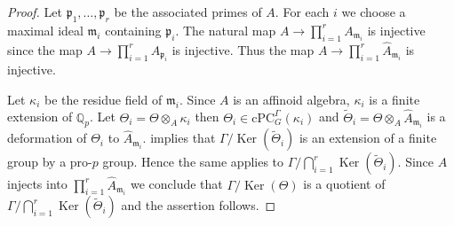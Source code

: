 \documentclass[10pt,a4paper]{amsart}
\DeclareMathOperator{\Ker}{Ker}
\newcommand{\Qp}{\mathbb {Q}_p}
\newcommand{\cPC}{\mathrm{cPC}}
\newcommand{\mm}{\mathfrak m}
\newcommand{\pp}{\mathfrak p}
\newcommand{\wTheta}{\widetilde{\Theta}}
\begin{document}
\begin{proof} Let $\pp_1, \ldots, \pp_r$ be the associated primes of $A$. For 
each $i$ 
we choose a maximal ideal $\mm_i$ containing $\pp_i$. The natural map 
$A\rightarrow \prod_{i=1}^r A_{\mm_i}$ is injective since the map 
$A\rightarrow \prod_{i=1}^r A_{\pp_i}$ is injective. Thus 
the map $A\rightarrow \prod_{i=1}^r \hat{A}_{\mm_i}$ is injective.

Let $\kappa_i$ be the residue field of $\mm_i$. Since $A$ is an affinoid algebra, 
$\kappa_i$ is a finite extension of $\Qp$. Let $\Theta_i=\Theta\otimes_A \kappa_i$ 
then $\Theta_i\in \cPC^{\Gamma}_G(\kappa_i)$ and $\wTheta_i=\Theta\otimes_A \hat{A}_{\mm_i}$
is a deformation of $\Theta_i$ to $\hat{A}_{\mm_i}$. 
implies that $\Gamma/\Ker(\wTheta_i)$ is an extension of  a finite group
by a pro-$p$ group. Hence the same applies to $\Gamma/\bigcap_{i=1}^r \Ker(\wTheta_i)$.
Since $A$ injects into $\prod_{i=1}^r \hat{A}_{\mm_i}$ we conclude
that $\Gamma/\Ker(\Theta)$ is a quotient of $\Gamma/\bigcap_{i=1}^r \Ker(\wTheta_i)$
and the assertion follows.
\end{proof}
\end{document}
